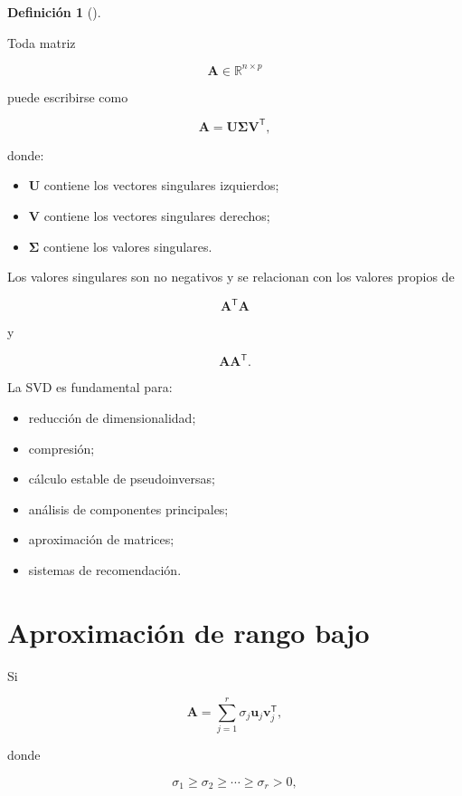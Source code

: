 \documentclass[
  spanish,
  11pt,
  letterpaper,
  DIV=11,
  numbers=noendperiod]{scrreprt}
\providecommand{\tightlist}{%
  \setlength{\itemsep}{0pt}\setlength{\parskip}{0pt}}
\theoremstyle{definition}
\newtheorem{definition}{Definición}[chapter]
\theoremstyle{plain}
\theoremstyle{definition}
\theoremstyle{remark}
\begin{document}
\begin{definition}[]\protect\hypertarget{def-svd}{}\label{def-svd}

Toda matriz

\[
\mathbf{A}\in\mathbb{R}^{n\times p}
\]

puede escribirse como

\[
\mathbf{A}
=
\mathbf{U}
\boldsymbol{\Sigma}
\mathbf{V}^{\mathsf T},
\]

donde:

\begin{itemize}
\tightlist
\item
  \(\mathbf{U}\) contiene los vectores singulares izquierdos;
\item
  \(\mathbf{V}\) contiene los vectores singulares derechos;
\item
  \(\boldsymbol{\Sigma}\) contiene los valores singulares.
\end{itemize}

\end{definition}

Los valores singulares son no negativos y se relacionan con los valores
propios de

\[
\mathbf{A}^{\mathsf T}\mathbf{A}
\]

y

\[
\mathbf{A}\mathbf{A}^{\mathsf T}.
\]

La SVD es fundamental para:

\begin{itemize}
\tightlist
\item
  reducción de dimensionalidad;
\item
  compresión;
\item
  cálculo estable de pseudoinversas;
\item
  análisis de componentes principales;
\item
  aproximación de matrices;
\item
  sistemas de recomendación.
\end{itemize}

\section{Aproximación de rango
bajo}\label{aproximaciuxf3n-de-rango-bajo}

Si

\[
\mathbf{A}
=
\sum_{j=1}^{r}
\sigma_j
\mathbf{u}_j
\mathbf{v}_j^{\mathsf T},
\]

donde

\[
\sigma_1\geq\sigma_2\geq\cdots\geq\sigma_r>0,
\]
\end{document}
